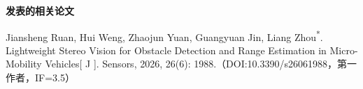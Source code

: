 \begin{publication}
\noindent\textbf{发表的相关论文}
\begin{publist}
\item	Jiansheng Ruan, Hui Weng, Zhaojun Yuan, Guangyuan Jin, Liang Zhou\textsuperscript{*}. Lightweight Stereo Vision for Obstacle Detection and Range Estimation in Micro-Mobility Vehicles[ J ]. Sensors, 2026, 26(6): 1988.（DOI:10.3390/s26061988，第一作者，IF=3.5）

\end{publist}
\end{publication}
